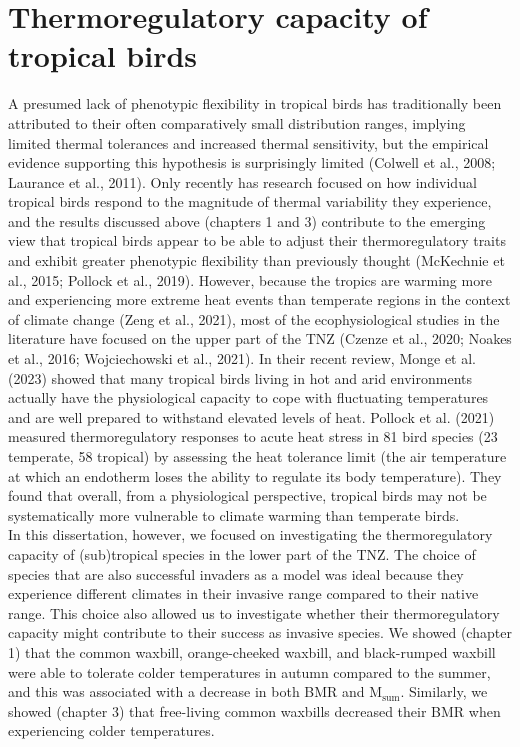 \documentclass[10pt, twoside]{book} %
\begin{document}
\section{Thermoregulatory capacity of tropical birds}
A presumed lack of phenotypic flexibility in tropical birds has traditionally been attributed to their often comparatively small distribution ranges, implying limited thermal tolerances and increased thermal sensitivity, but the empirical evidence supporting this hypothesis is surprisingly limited (Colwell et al., 2008; Laurance et al., 2011). Only recently has research focused on how individual tropical birds respond to the magnitude of thermal variability they experience, and the results discussed above (chapters 1 and 3) contribute to the emerging view that tropical birds appear to be able to adjust their thermoregulatory traits and exhibit greater phenotypic flexibility than previously thought (McKechnie et al., 2015; Pollock et al., 2019). However, because the tropics are warming more and experiencing more extreme heat events than temperate regions in the context of climate change (Zeng et al., 2021), most of the ecophysiological studies in the literature have focused on the upper part of the TNZ (Czenze et al., 2020; Noakes et al., 2016; Wojciechowski et al., 2021). In their recent review, Monge et al. (2023) showed that many tropical birds living in hot and arid environments actually have the physiological capacity to cope with fluctuating temperatures and are well prepared to withstand elevated levels of heat. Pollock et al. (2021) measured thermoregulatory responses to acute heat stress in 81 bird species (23 temperate, 58 tropical) by assessing the heat tolerance limit (the air temperature at which an endotherm loses the ability to regulate its body temperature). They found that overall, from a physiological perspective, tropical birds may not be systematically more vulnerable to climate warming than temperate birds.\\

In this dissertation, however, we focused on investigating the thermoregulatory capacity of (sub)tropical species in the lower part of the TNZ. The choice of species that are also successful invaders as a model was ideal because they experience different climates in their invasive range compared to their native range. This choice also allowed us to investigate whether their thermoregulatory capacity might contribute to their success as invasive species. We showed (chapter 1) that the common waxbill, orange-cheeked waxbill, and black-rumped waxbill were able to tolerate colder temperatures in autumn compared to the summer, and this was associated with a decrease in both BMR and M$_{\text{sum}}$. Similarly, we showed (chapter 3) that free-living common waxbills decreased their BMR when experiencing colder temperatures.\\
\end{document}
